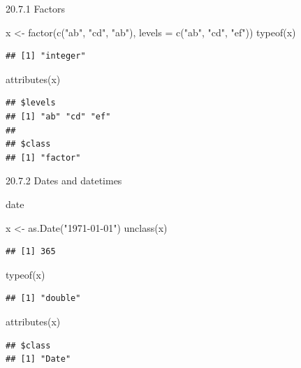 \documentclass[
  ignorenonframetext,
]{beamer}
\newenvironment{Shaded}{\begin{snugshade}}{\end{snugshade}}
\newcommand{\AttributeTok}[1]{\textcolor[rgb]{0.77,0.63,0.00}{#1}}
\newcommand{\FunctionTok}[1]{\textcolor[rgb]{0.00,0.00,0.00}{#1}}
\newcommand{\NormalTok}[1]{#1}
\newcommand{\OtherTok}[1]{\textcolor[rgb]{0.56,0.35,0.01}{#1}}
\newcommand{\StringTok}[1]{\textcolor[rgb]{0.31,0.60,0.02}{#1}}
\begin{document}
\begin{frame}[fragile]{20.7.1 Factors}
\protect\hypertarget{factors}{}
\begin{Shaded}
\begin{Highlighting}[]
\NormalTok{x }\OtherTok{\textless{}{-}} \FunctionTok{factor}\NormalTok{(}\FunctionTok{c}\NormalTok{(}\StringTok{"ab"}\NormalTok{, }\StringTok{"cd"}\NormalTok{, }\StringTok{"ab"}\NormalTok{), }\AttributeTok{levels =} \FunctionTok{c}\NormalTok{(}\StringTok{"ab"}\NormalTok{, }\StringTok{"cd"}\NormalTok{, }\StringTok{"ef"}\NormalTok{))}
\FunctionTok{typeof}\NormalTok{(x)}
\end{Highlighting}
\end{Shaded}

\begin{verbatim}
## [1] "integer"
\end{verbatim}

\begin{Shaded}
\begin{Highlighting}[]
\FunctionTok{attributes}\NormalTok{(x)}
\end{Highlighting}
\end{Shaded}

\begin{verbatim}
## $levels
## [1] "ab" "cd" "ef"
## 
## $class
## [1] "factor"
\end{verbatim}
\end{frame}

\begin{frame}[fragile]{20.7.2 Dates and datetimes}
\protect\hypertarget{dates-and-datetimes}{}
\begin{block}{date}
\protect\hypertarget{date}{}
\begin{Shaded}
\begin{Highlighting}[]
\NormalTok{x }\OtherTok{\textless{}{-}} \FunctionTok{as.Date}\NormalTok{(}\StringTok{"1971{-}01{-}01"}\NormalTok{)}
\FunctionTok{unclass}\NormalTok{(x)}
\end{Highlighting}
\end{Shaded}

\begin{verbatim}
## [1] 365
\end{verbatim}

\begin{Shaded}
\begin{Highlighting}[]
\FunctionTok{typeof}\NormalTok{(x)}
\end{Highlighting}
\end{Shaded}

\begin{verbatim}
## [1] "double"
\end{verbatim}

\begin{Shaded}
\begin{Highlighting}[]
\FunctionTok{attributes}\NormalTok{(x)}
\end{Highlighting}
\end{Shaded}

\begin{verbatim}
## $class
## [1] "Date"
\end{verbatim}
\end{block}
\end{frame}
\end{document}
